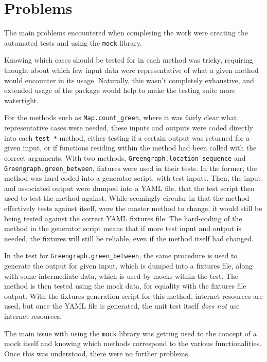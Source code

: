 \documentclass{article}
\begin{document}
\section*{Problems}
The main problems encountered when completing the work were creating the automated tests and using the \texttt{mock} library.
\par
Knowing which cases should be tested for in each method was tricky, requiring thought about which few input data were representative of what a given method would encounter in its usage. Naturally, this wasn't completely exhaustive, and extended usage of the package would help to make the testing suite more watertight.
\par
For the methods such as \nolinkurl{Map.count_green}, where it was fairly clear what representative cases were needed, these inputs and outputs were coded directly into each \nolinkurl{test_*} method, either testing if a certain output was returned for a given input, or if functions residing within the method had been called with the correct arguments. With two methods, \nolinkurl{Greengraph.location_sequence} and \nolinkurl{Greengraph.green_between}, fixtures were used in their tests. In the former, the method was hard coded into a generator script, with test inputs. Then, the input and associated output were dumped into a YAML file, that the test script then used to test the method against. While seemingly circular in that the method effectively tests against itself, were the master method to change, it would still be being tested against the correct YAML fixtures file. The hard-coding of the method in the generator script means that if more test input and output is needed, the fixtures will still be reliable, even if the method itself had changed.
\par
In the test for \nolinkurl{Greengraph.green_between}, the same procedure is used to generate the output for given input, which is dumped into a fixtures file, along with some intermediate data, which is used by mocks within the test. The method is then tested using the mock data, for equality with the fixtures file output. With the fixtures generation script for this method, internet resources are used, but once the YAML file is generated, the unit test itself \emph{does not} use internet resources.
\par
The main issue with using the \texttt{mock} library was getting used to the concept of a mock itself and knowing which methods correspond to the various functionalities. Once this was understood, there were no further problems.
\end{document}
